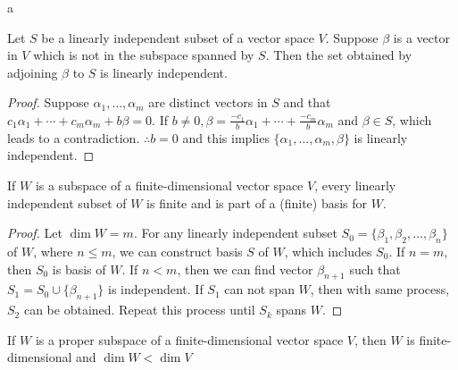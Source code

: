 \documentclass[8pt]{beamer}
\begin{document}
\begin{frame}{a}
    \begin{lemma}
        Let $S$ be a linearly independent subset of a vector space $V$. Suppose $\beta$ is a vector in $V$ which is not in the subspace spanned by $S$. Then the set obtained by adjoining $\beta$ to $S$ is linearly independent.
    \end{lemma}
    \begin{proof}
    Suppose $\alpha_1, \dots, \alpha_m$ are distinct vectors in $S$ and that $c_1\alpha_1 + \cdots + c_m \alpha_m + b \beta = 0$.
    If $b\neq 0, \beta = \frac{-c_1}{b}\alpha_1 + \cdots + \frac{-c_m}{b}\alpha_m$ and $\beta \in S$, which leads to a contradiction. $\therefore b = 0$ and this implies $\{\alpha_1, \dots, \alpha_m, \beta\}$ is linearly independent.
    \end{proof}

    \begin{theorem}
        If $W$ is a subspace of a finite-dimensional vector space $V$, every linearly independent subset of $W$ is finite and is part of a (finite) basis for $W$.
    \end{theorem}
    \begin{proof}
        Let $\dim{W} = m$. For any linearly independent subset $S_0 = \{\beta_1, \beta_2, \dots, \beta_n\}$ of $W$, where $n \leq m$, we can construct basis $S$ of $W$, which includes $S_0$. If $n = m$, then $S_0$ is basis of $W$. If $n < m$, then we can find vector $\beta_{n+1}$ such that $S_1 =  S_0 \cup \{\beta_{n+1}\}$ is independent. If $S_1$ can not span $W$, then with same process, $S_2$ can be obtained. Repeat this process until $S_k$ spans $W$.
    \end{proof}
     \begin{corollary}
        If $W$ is a proper subspace of a finite-dimensional vector space $V$, then $W$ is finite-dimensional and $\dim{W}<\dim{V}$
    \end{corollary}
\end{frame}
\end{document}

